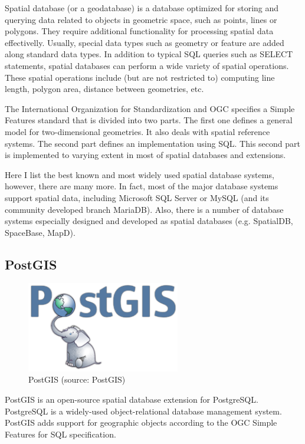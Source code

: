 Spatial database (or a geodatabase) is a database optimized for storing and querying data related to objects in geometric space, such as points, lines or polygons. They require additional functionality for processing spatial data effectivelly. Usually, special data types such as geometry or feature are added along standard data types. In addition to typical SQL queries such as SELECT statements, spatial databases can perform a wide variety of spatial operations. These spatial operations include (but are not restricted to) computing line length, polygon area, distance between geometries, etc.

The International Organization for Standardization and OGC specifies a Simple Features standard that is divided into two parts. The first one defines a general model for two-dimensional geometries. It also deals with spatial reference systems. The second part defines an implementation using SQL. This second part is implemented to varying extent in most of spatial databases and extensions.

Here I list the best known and most widely used spatial database systems, however, there are many more. In fact, most of the major database systems support spatial data, including Microsoft SQL Server or MySQL (and its community developed branch MariaDB). Also, there is a number of database systems especially designed and developed as spatial databases (e.g. SpatialDB, SpaceBase, MapD).

\subsection{PostGIS}
\begin{figure}[H] \centering
      \includegraphics[width=190pt]{./pictures/postgis.png}
      \caption[PostGIS logo]{PostGIS (source: PostGIS)}
      \label{fig:PostGIS}
  \end{figure}
  
PostGIS is an open-source spatial database extension for PostgreSQL. PostgreSQL is a widely-used object-relational database management system. PostGIS adds support for geographic objects according to the OGC Simple Features for SQL specification. 

